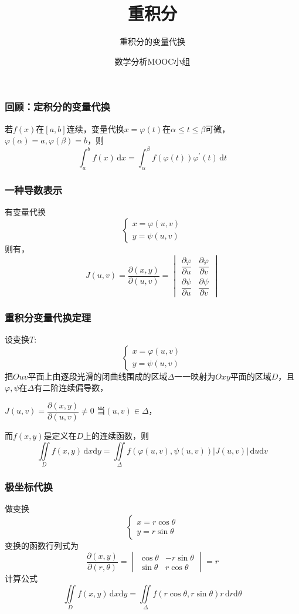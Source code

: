 \documentclass[xetex]{beamer}
\title{重积分}
\subtitle{重积分的变量代换}
\author{数学分析MOOC小组 }
\date{}
\begin{document}
\frame{\maketitle}

\begin{frame}
    \frametitle{回顾：定积分的变量代换}
    若$f(x)$在$[a,b]$连续，变量代换$x=\varphi(t)$在$\alpha\leq t \leq\beta$可微，$\varphi(\alpha)=a,\varphi(\beta)=b$，则
    $$\int_a^bf(x)\,\mathrm{d}x=\int_{\alpha}^{\beta}f(\varphi(t))\varphi^\prime(t)\,\mathrm{d}t$$
\end{frame}

\begin{frame}
    \frametitle{一种导数表示}
    有变量代换
    $$\begin{cases}
        x=\varphi(u,v)\\
        y=\psi(u,v)
    \end{cases}$$
    则有，
    $$J(u,v)=\dfrac{\partial(x,y)}{\partial(u,v)}=
        \begin{vmatrix}
             \dfrac{\partial\varphi}{\partial u} & \dfrac{\partial \varphi}{\partial v} \\
             \dfrac{\partial\psi}{\partial u} & \dfrac{\partial \psi}{\partial v}
         \end{vmatrix}
         $$
\end{frame}

\begin{frame}
    \frametitle{重积分变量代换定理}
    设变换$T:$
    $$\begin{cases}
        x=\varphi(u,v)\\
        y=\psi(u,v)
    \end{cases}$$
    把$Ouv$平面上由逐段光滑的闭曲线围成的区域$\Delta$一一映射为$Oxy$平面的区域$D$，且$\varphi,\psi$在$\Delta$有二阶连续偏导数，
    \begin{center}
    $J(u,v)=\dfrac{\partial(x,y)}{\partial(u,v)}\neq0$ \quad 当$(u,v)\in\Delta$，
    \end{center}
    而$f(x,y)$是定义在$D$上的连续函数，则
    $$\iint\limits_Df(x,y)\,\mathrm{d}x\mathrm{d}y=\iint\limits_{\Delta}f(\varphi(u,v),\psi(u,v))|J(u,v)|\,\mathrm{d}u\mathrm{d}v$$
\end{frame}

\begin{frame}
    \frametitle{极坐标代换}
    做变换
    $$\begin{cases}
        x=r\cos{\theta}\\
        y=r\sin{\theta}
    \end{cases}$$
    变换的函数行列式为
    $$\dfrac{\partial(x,y)}{\partial(r,\theta)}=
    \begin{vmatrix}
        \cos{\theta} & -r\sin{\theta} \\
        \sin{\theta} & r\cos{\theta}
    \end{vmatrix}
    =r$$
    计算公式
    $$\iint\limits_Df(x,y)\,\mathrm{d}x\mathrm{d}y=\iint\limits_{\Delta}f(r\cos{\theta},r\sin{\theta})r\,\mathrm{d}r\mathrm{d}\theta$$
\end{frame}
\end{document}
